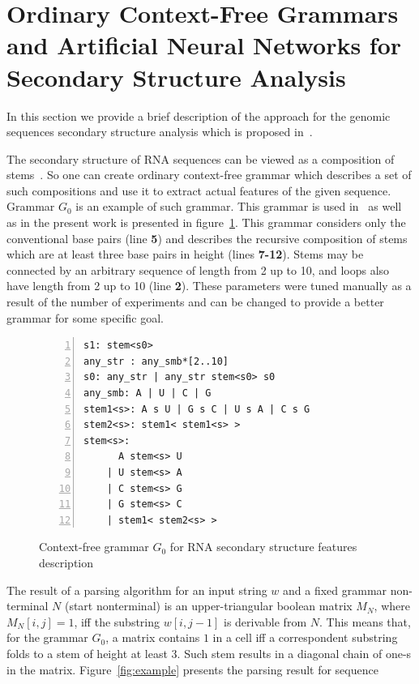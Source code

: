 \section{Ordinary Context-Free Grammars and Artificial Neural Networks for Secondary Structure Analysis}

In this section we provide a brief description of the approach for the genomic sequences secondary structure analysis which is proposed in~\cite{grigorevcomposition}.

The secondary structure of RNA sequences can be viewed as a composition of stems~\cite{MQbioinformatics19}. 
So one can create ordinary context-free grammar which describes a set of such compositions and use it to extract actual features of the given sequence. 
Grammar $G_0$ is an example of such grammar.
This grammar is used in~\cite{grigorevcomposition} as well as in the present work is presented in figure~\ref{gram}.
This grammar considers only the conventional base pairs (line \textbf{5}) and describes the recursive composition of stems which are at least three base pairs in height (lines \textbf{7-12}).
Stems may be connected by an arbitrary sequence of length from 2 up to 10, and loops also have length from 2 up to 10 (line \textbf{2}).
These parameters were tuned manually as a result of the number of experiments and can be changed to provide a better grammar for some specific goal.

\begin{figure}
\begin{Verbatim}[numbers=left,xleftmargin=5mm]
s1: stem<s0>
any_str : any_smb*[2..10]
s0: any_str | any_str stem<s0> s0
any_smb: A | U | C | G
stem1<s>: A s U | G s C | U s A | C s G 
stem2<s>: stem1< stem1<s> >
stem<s>:  
      A stem<s> U 
    | U stem<s> A 
    | C stem<s> G 
    | G stem<s> C 
    | stem1< stem2<s> >  
\end{Verbatim}
\caption{Context-free grammar $G_0$ for RNA secondary structure features description}
\label{gram}
\end{figure}

The result of a parsing algorithm for an input string $w$ and a fixed grammar non-terminal $N$ (start nonterminal) is an upper-triangular boolean matrix $M_N$, where $M_N [i,j] = 1$, iff the substring $w[i,j-1]$ is derivable from $N$.
This means that, for the grammar $G_0$, a matrix contains $1$ in a cell iff a correspondent substring folds to a  stem of height at least 3.
Such stem results in a diagonal chain of one-s in the matrix.
Figure~\ref{fig:example} presents the parsing result for sequence

